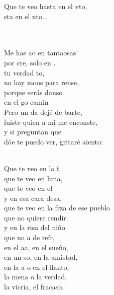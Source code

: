 \begin{cancion}
\begin{chorus}
	Que te veo hasta en el vto, \\
	sta en el nto...\\
	\end{chorus}%
	\jump\\
	   \\
	Me has ao en tantaosas \\
	por cre, solo en . \\
	 tu verdad to, \\
	no hay moos para rense,\\
	porque  serás danso \\
	en el go camin\\
\jump
	Pero un da dejé de barte, \\
	fuiste  quien a mi me enconste, \\
	y si  preguntan que \\
	dóe te puedo ver, gritaré aiento:\\\jump\\
	\begin{chorus}%
	Que te veo en la f, \\
	que te veo en luna,\\
	que te veo en el  \\
	y en esa cara desa,\\
	que te veo en la frza de ese pueblo\\
	que no  quiere rendir\\
	y en la risa del niño \\
	que no a de reír,\\
	en el aa, en el sueño, \\
	en un so, en la amistad,\\
	en la a o en el llanto, \\
	la mena o la verdad,\\
	la vicria, el fracaso, \\

\end{chorus}
\end{cancion}
